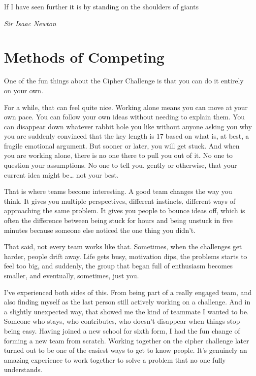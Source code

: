 \epigraph{If I have seen further it is by standing on the shoulders of giants}
{\textit{Sir Isaac Newton}}



\section{Methods of Competing}

One of the fun things about the Cipher Challenge is that you can do it entirely on your own.

For a while, that can feel quite nice. Working alone means you can move at your own pace. You can follow your own ideas without needing to explain them. You can disappear down whatever rabbit hole you like without anyone asking you why you are suddenly convinced that the key length is 17 based on what is, at best, a fragile emotional argument.
But sooner or later, you will get stuck. And when you are working alone, there is no one there to pull you out of it. No one to question your assumptions. No one to tell you, gently or otherwise, that your current idea might be… not your best.

That is where teams become interesting. A good team changes the way you think. It gives you multiple perspectives, different instincts, different ways of approaching the same problem. It gives you people to bounce ideas off, which is often the difference between being stuck for hours and being unstuck in five minutes because someone else noticed the one thing you didn’t.

That said, not every team works like that. Sometimes, when the challenges get harder, people drift away. Life gets busy, motivation dips, the problems starts to feel too big, and suddenly, the group that began full of enthusiasm becomes smaller, and eventually, sometimes, just you.

I’ve experienced both sides of this. From being part of a really engaged team, and also finding myself as the last person still actively working on a challenge. And in a slightly unexpected way, that showed me the kind of teammate I wanted to be. Someone who stays, who contributes, who doesn’t disappear when things stop being easy. Having joined a new school for sixth form, I had the fun change of forming a new team from scratch. Working together on the cipher challenge later turned out to be one of the easiest ways to get to know people. It's genuinely an amazing experience to work together to solve a problem that no one fully understands. 

